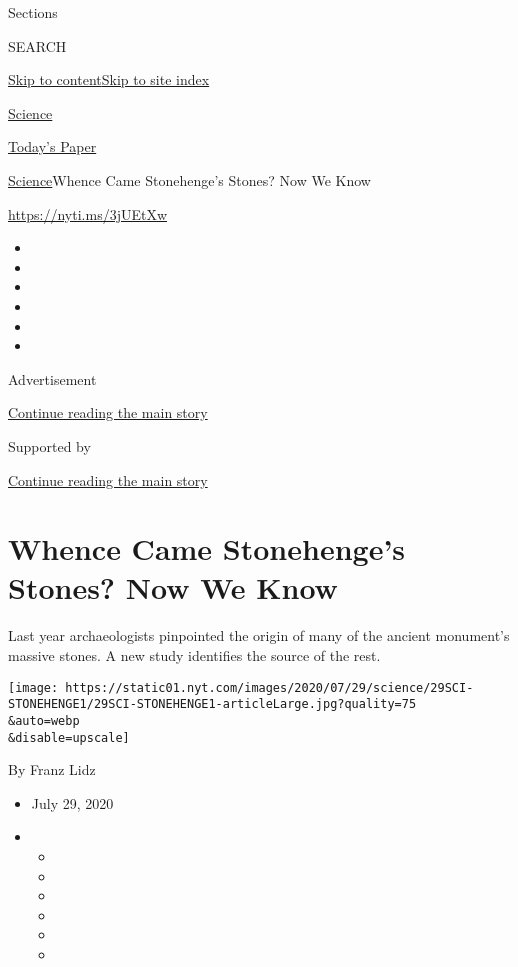 Sections

SEARCH

\protect\hyperlink{site-content}{Skip to
content}\protect\hyperlink{site-index}{Skip to site index}

\href{https://www.nytimes.com/section/science}{Science}

\href{https://myaccount.nytimes.com/auth/login?response_type=cookie\&client_id=vi}{}

\href{https://www.nytimes.com/section/todayspaper}{Today's Paper}

\href{/section/science}{Science}\textbar{}Whence Came Stonehenge's
Stones? Now We Know

\url{https://nyti.ms/3jUEtXw}

\begin{itemize}
\item
\item
\item
\item
\item
\item
\end{itemize}

Advertisement

\protect\hyperlink{after-top}{Continue reading the main story}

Supported by

\protect\hyperlink{after-sponsor}{Continue reading the main story}

\hypertarget{whence-came-stonehenges-stones-now-we-know}{%
\section{Whence Came Stonehenge's Stones? Now We
Know}\label{whence-came-stonehenges-stones-now-we-know}}

Last year archaeologists pinpointed the origin of many of the ancient
monument's massive stones. A new study identifies the source of the
rest.

\texttt{[image: https://static01.nyt.com/images/2020/07/29/science/29SCI-STONEHENGE1/29SCI-STONEHENGE1-articleLarge.jpg?quality=75\\\&auto=webp\\\&disable=upscale]}

By Franz Lidz

\begin{itemize}
\item
  July 29, 2020
\item
  \begin{itemize}
  \item
  \item
  \item
  \item
  \item
  \item
  \end{itemize}
\end{itemize}

